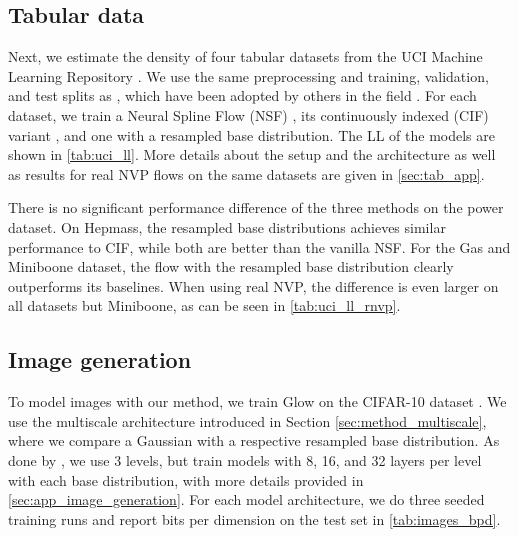 \documentclass[twoside]{article}
\begin{document}
\subsection{Tabular data}

Next, we estimate the density of four tabular datasets from the UCI Machine Learning Repository \citep{Dheeru2021}. We use the same preprocessing and training, validation, and test splits as \cite{Papamakarios2017}, which have been adopted by others in the field \citep{Durkan2019,Cornish2020}. For each dataset, we train a Neural Spline Flow (NSF) \citep{Durkan2019}, its continuously indexed (CIF) variant \citep{Cornish2020}, and one with a resampled base distribution. The LL of the models are shown in \autoref{tab:uci_ll}. More details about the setup and the architecture as well as results for real NVP flows on the same datasets are given in \autoref{sec:tab_app}.

There is no significant performance difference of the three methods on the power dataset. On Hepmass, the resampled base distributions achieves similar performance to CIF, while both are better than the vanilla NSF. For the Gas and Miniboone dataset, the flow with the resampled base distribution clearly outperforms its baselines. When using real NVP, the difference is even larger on all datasets but Miniboone, as can be seen in \autoref{tab:uci_ll_rnvp}.


\subsection{Image generation}
\label{sec:exp_images}

To model images with our method, we train Glow \citep{Kingma2018} on the CIFAR-10 dataset \citep{Krizhevsky2009}. We use the multiscale architecture introduced in Section \ref{sec:method_multiscale}, where we compare a Gaussian with a respective resampled base distribution. As done by \cite{Kingma2018}, we use 3 levels, but train models with 8, 16, and 32 layers per level with each base distribution, with more details provided in \autoref{sec:app_image_generation}. For each model architecture, we do three seeded training runs and report bits per dimension on the test set in \autoref{tab:images_bpd}.
\end{document}

